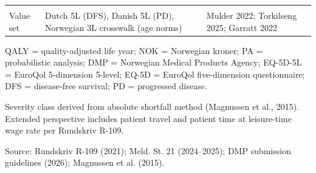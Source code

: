 \begin{table}[H]
{\begin{threeparttable}
\begin{tabular}[t]{>{\raggedright\arraybackslash}p{3.2cm}>{\raggedright\arraybackslash}p{3.2cm}>{\raggedright\arraybackslash}p{5.2cm}}
\cellcolor[HTML]{F7F9FC}{\textcolor[HTML]{2D3748}{EQ-5D instrument}} & \cellcolor[HTML]{F7F9FC}{\textcolor[HTML]{2D3748}{EQ-5D-5L}} & \cellcolor[HTML]{F7F9FC}{\textcolor[HTML]{2D3748}{DMP submission guidelines (July 2026)}}\\
\textcolor[HTML]{2D3748}{Value set} & \textcolor[HTML]{2D3748}{Dutch 5L (DFS), Danish 5L (PD), Norwegian 3L crosswalk (age norms)} & \textcolor[HTML]{2D3748}{Mulder 2022; Torkilseng 2025; Garratt 2022}\\
\bottomrule
\end{tabular}
\begin{tablenotes}
\item QALY = quality-adjusted life year; NOK = Norwegian kroner; PA = probabilistic analysis; DMP = Norwegian Medical Products Agency; EQ-5D-5L = EuroQol 5-dimension 5-level; EQ-5D = EuroQol five-dimension questionnaire; DFS = disease-free survival; PD = progressed disease.
\item Severity class derived from absolute shortfall method (Magnussen et al., 2015). Extended perspective includes patient travel and patient time at leisure-time wage rate per Rundskriv R-109.
\item Source: Rundskriv R-109 (2021); Meld. St. 21 (2024--2025); DMP submission guidelines (2026); Magnussen et al. (2015).
\end{tablenotes}
\end{threeparttable}
}
\end{table}
